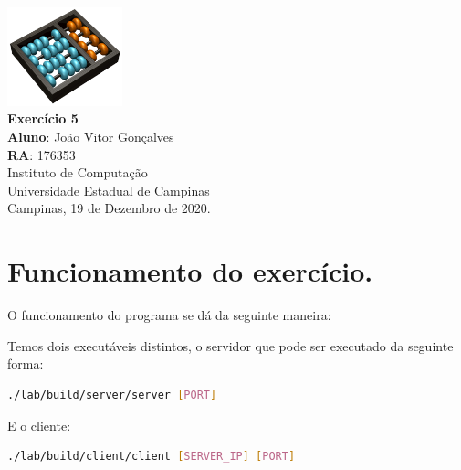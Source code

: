 \documentclass[12pt,a4paper]{report}
\begin{document}
\begin{titlepage}
        \begin{center}
                \vspace*{1cm}
                \includegraphics[width=0.25\textwidth]{Logo}\\
                \vspace{1.5cm}
                \Huge
                \textbf{Exercício 5}\\
                \vspace{1.5cm}
                \Large
                \textbf{Aluno}: João Vitor Gonçalves\\
                \textbf{RA}: 176353\\
                \vspace{1.2cm}
                \Large
                Instituto de Computação\\
                Universidade Estadual de Campinas\\
                \vspace{1.5cm}
                Campinas, 19 de Dezembro de 2020.
        \end{center}
\end{titlepage}
\tableofcontents
\clearpage

\newcommand{\shellcmd}[1]{\texttt{\footnotesize\# #1}}%

\section{Funcionamento do exercício.}

O funcionamento do programa se dá da seguinte maneira:

Temos dois executáveis distintos, o servidor que pode ser executado da seguinte forma:

\begin{lstlisting}[language=bash]
    ./lab/build/server/server [PORT]
\end{lstlisting}


E o cliente:
\begin{lstlisting}[language=bash]
    ./lab/build/client/client [SERVER_IP] [PORT]
\end{lstlisting}
\end{document}
